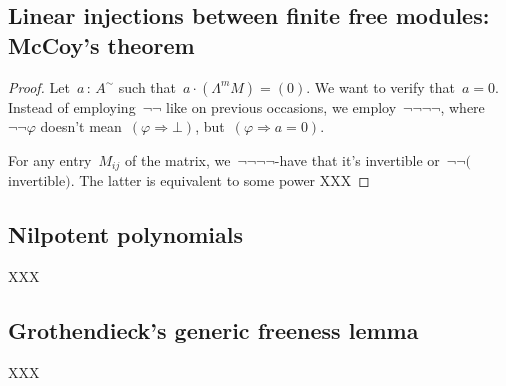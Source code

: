 \documentclass{amsart}
\theoremstyle{definition}
\theoremstyle{plain}
\theoremstyle{remark}
\newcommand{\?}{\,{:}\,}
\newcommand{\negg}{\neg\!\!\!\neg}
\begin{document}
\subsection{Linear injections between finite free modules: McCoy's theorem}

\begin{proof}Let~$a \? A^\sim$ such that~$a \cdot (\Lambda^m M) = (0)$. We want
to verify that~$a = 0$. Instead of employing~$\neg\neg$ like on previous
occasions, we employ~$\negg\negg$, where~$\negg\varphi$ doesn't mean~$(\varphi
\Rightarrow \bot)$, but~$(\varphi \Rightarrow a = 0)$.

For any entry~$M_{ij}$ of the matrix, we~$\negg\negg$-have that it's invertible
or~$\negg($invertible$)$. The latter is equivalent to some power XXX
\end{proof}


\subsection{Nilpotent polynomials}

XXX

\subsection{Grothendieck's generic freeness lemma}

XXX
\end{document}
